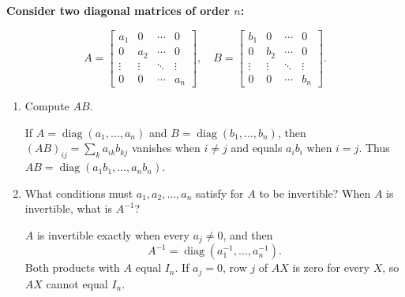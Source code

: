 \providecommand{\rank}{\operatorname{r}}
\providecommand{\RR}{\mathbb R}
\providecommand{\CC}{\mathbb C}
\providecommand{\KK}{\mathbb K}

\setcounter{enumi}{20}
\item {\bfseries\boldmath
Consider two diagonal matrices of order $n$:
}

\[
A=\begin{bmatrix}a_1&0&\cdots&0\\0&a_2&\cdots&0\\\vdots&\vdots&\ddots&\vdots\\0&0&\cdots&a_n\end{bmatrix},\quad B=\begin{bmatrix}b_1&0&\cdots&0\\0&b_2&\cdots&0\\\vdots&\vdots&\ddots&\vdots\\0&0&\cdots&b_n\end{bmatrix}.
\]

\begin{enumerate}[label=\alph*)]

\item Compute $AB$.

\begin{answer}
If $A=\operatorname{diag}(a_1,\ldots,a_n)$ and
$B=\operatorname{diag}(b_1,\ldots,b_n)$, then
$(AB)_{ij}=\sum_k a_{ik}b_{kj}$ vanishes when $i\ne j$ and equals $a_ib_i$
when $i=j$. Thus $AB=\operatorname{diag}(a_1b_1,\ldots,a_nb_n)$.
\end{answer}

\item What conditions must $a_1,a_2,\ldots,a_n$ satisfy for $A$ to be invertible? When $A$ is invertible, what is $A^{-1}$?

\begin{answer}
$A$ is invertible exactly when every $a_j\ne0$, and then
\[
 A^{-1}=\operatorname{diag}(a_1^{-1},\ldots,a_n^{-1}).
\]
Both products with $A$ equal $I_n$. If $a_j=0$, row $j$ of $AX$ is zero for
every $X$, so $AX$ cannot equal $I_n$.
\end{answer}
\end{enumerate}
